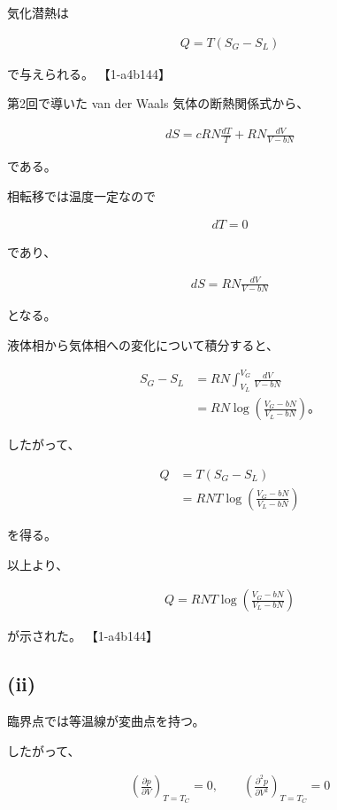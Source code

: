 \documentclass[platex,dvipdfmx,a4paper]{jsarticle}
\begin{document}
気化潜熱は

\begin{align*}
Q=T(S_G-S_L)
\end{align*}

で与えられる。 【1-a4b144】

第2回で導いた van der Waals 気体の断熱関係式から、

\begin{align*}
dS
=
cRN
\frac{dT}{T}
+
RN
\frac{dV}{V-bN}
\end{align*}

である。

相転移では温度一定なので

\begin{align*}
dT=0
\end{align*}

であり、

\begin{align*}
dS
=
RN
\frac{dV}{V-bN}
\end{align*}

となる。

液体相から気体相への変化について積分すると、

\begin{align*}
S_G-S_L
&=
RN
\int_{V_L}^{V_G}
\frac{dV}{V-bN}
\\
&=
RN
\log
\left(
\frac{V_G-bN}
     {V_L-bN}
\right)。
\end{align*}

したがって、

\begin{align*}
Q
&=
T(S_G-S_L)
\\
&=
RNT
\log
\left(
\frac{V_G-bN}
     {V_L-bN}
\right)
\end{align*}

を得る。

以上より、

\begin{align*}
Q
=
RNT
\log
\left(
\frac{V_G-bN}
     {V_L-bN}
\right)
\end{align*}

が示された。 【1-a4b144】

\subsection{(ii)}

臨界点では等温線が変曲点を持つ。

したがって、

\begin{align*}
\left(
\frac{\partial p}{\partial V}
\right)_{T=T_C}
=
0,
\qquad
\left(
\frac{\partial^2p}{\partial V^2}
\right)_{T=T_C}
=
0
\end{align*}
\end{document}
